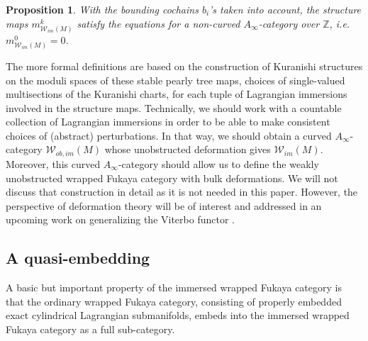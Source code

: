 \documentclass{amsart}
\newtheorem{proposition}[theorem]{Proposition}
\numberwithin{equation}{section}
\numberwithin{figure}{section}
\begin{document}
\begin{proposition}
	With the bounding cochains $b_{i}$'s taken into account, the structure maps $m^{k}_{\mathcal{W}_{im}(M)}$ satisfy the equations for a non-curved $A_{\infty}$-category over $\mathbb{Z}$, i.e. $m^{0}_{\mathcal{W}_{im}(M)} = 0$.
\end{proposition}

	The more formal definitions are based on the construction of Kuranishi structures on the moduli spaces of these stable pearly tree maps, choices of single-valued multisections of the Kuranishi charts, for each tuple of Lagrangian immersions involved in the structure maps. Technically, we should work with a countable collection of Lagrangian immersions in order to be able to make consistent choices of (abstract) perturbations. In that way, we should obtain a curved $A_{\infty}$-category $\mathcal{W}_{ob, im}(M)$ whose unobstructed deformation gives $\mathcal{W}_{im}(M)$. Moreover, this curved $A_{\infty}$-category should allow us to define the weakly unobstructed wrapped Fukaya category with bulk deformations. We will not discuss that construction in detail as it is not needed in this paper. However, the perspective of deformation theory will be of interest and addressed in an upcoming work on generalizing the Viterbo functor \cite{Gao2}. \par

\subsection{A quasi-embedding}

	A basic but important property of the immersed wrapped Fukaya category is that the ordinary wrapped Fukaya category, consisting of properly embedded exact cylindrical Lagrangian submanifolds, embeds into the immersed wrapped Fukaya category as a full sub-category. \par
\end{document}
